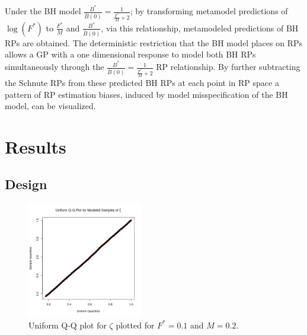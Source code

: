 Under the BH model $\frac{B^*}{\bar B(0)}=\frac{1}{\frac{F^*}{M}+2}$; by transforming metamodel
predictions of $\log(F^*)$ to $\frac{F^*}{M}$ and $\frac{B^*}{\bar B(0)}$, via this relationship, 
metamodeled predictions of BH RPs are obtained. The deterministic restriction that the BH model 
places on RPs allows a GP with a one dimensional response to model both BH RPs simultaneously 
through the $\frac{B^*}{\bar B(0)}=\frac{1}{\frac{F^*}{M}+2}$ RP relationship.
By further subtracting the Schnute RPs from these predicted BH RPs
at each point in RP space a pattern of RP estimation biases, induced by model 
misspecification of the BH model, can be visualized. %

\section{Results}

%
\subsection{Design}

%
\begin{figure}
\vspace{-1.5cm}
\includegraphics[width=0.45\textwidth]{../gpBias/qqUnif.png}
\vspace{-1cm} %
\caption{Uniform Q-Q plot for $\zeta$ plotted for $F^*=0.1$ and $M=0.2$.}
\label{qqZeta}
\end{figure}

